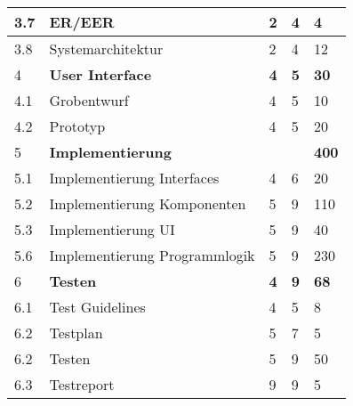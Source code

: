 \begin{tabular}{ | l | p{8cm} | p{2cm}|p{2cm}|p{2cm}|}
\hline
3.7 &ER/EER                            &2 &4 & 4 \\
\hline
3.8 &Systemarchitektur                 &2 &4 & 12 \\
\hline
4 &\textbf{User Interface}                   &\textbf{4} &\textbf{5} & \textbf{30} \\
\hline
4.1 &Grobentwurf                       &4 &5 & 10 \\
\hline
4.2 &Prototyp                          &4 &5 & 20 \\
\hline
5 &\textbf{Implementierung}                 & & & \textbf{400} \\
\hline
5.1 &Implementierung Interfaces        &4 &6 & 20 \\
\hline
5.2 &Implementierung Komponenten       &5 &9 & 110 \\
\hline
5.3 &Implementierung UI                &5 &9 & 40 \\
\hline
5.6 &Implementierung Programmlogik     &5 &9 & 230 \\
\hline
6 &\textbf{Testen}                           &\textbf{4} &\textbf{9} & \textbf{68} \\
\hline
6.1 &Test Guidelines                   &4 &5 & 8 \\
\hline
6.2 &Testplan                          &5 &7 & 5 \\
\hline
6.2 &Testen                            &5 &9 & 50 \\
\hline
6.3 &Testreport                        &9 &9 & 5 \\
\hline
\end{tabular}

